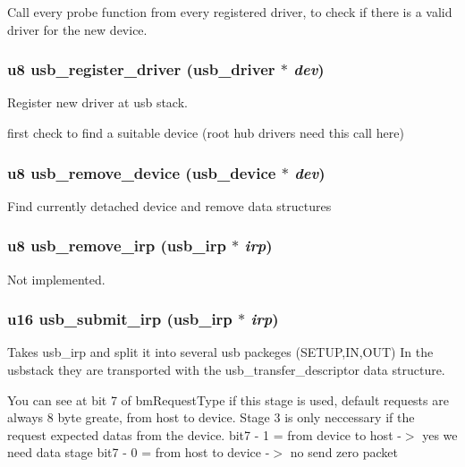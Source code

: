 Call every probe function from every registered driver, to check if there is a valid driver for the new device. 
\subsubsection{\setlength{\rightskip}{0pt plus 5cm}u8 usb\_\-register\_\-driver ({\bf usb\_\-driver} $\ast$ {\em dev})}\label{core_8h_6dda3b9fd835433080e92265e3678a8b}


Register new driver at usb stack. 

first check to find a suitable device (root hub drivers need this call here) 
\subsubsection{\setlength{\rightskip}{0pt plus 5cm}u8 usb\_\-remove\_\-device ({\bf usb\_\-device} $\ast$ {\em dev})}\label{core_8h_750a0d6554fd2aec4459d0e3af2dd6ef}


Find currently detached device and remove data structures 
\subsubsection{\setlength{\rightskip}{0pt plus 5cm}u8 usb\_\-remove\_\-irp ({\bf usb\_\-irp} $\ast$ {\em irp})}\label{core_8h_ddc2d9767934c9943b6e08b8b8125b33}


Not implemented. 
\subsubsection{\setlength{\rightskip}{0pt plus 5cm}u16 usb\_\-submit\_\-irp ({\bf usb\_\-irp} $\ast$ {\em irp})}\label{core_8h_265cc39d7b493019e5681b27a4349183}


Takes usb\_\-irp and split it into several usb packeges (SETUP,IN,OUT) In the usbstack they are transported with the usb\_\-transfer\_\-descriptor data structure. 

You can see at bit 7 of bm\-Request\-Type if this stage is used, default requests are always 8 byte greate, from host to device. Stage 3 is only neccessary if the request expected datas from the device. bit7 - 1 = from device to host -$>$ yes we need data stage bit7 - 0 = from host to device -$>$ no send zero packet

